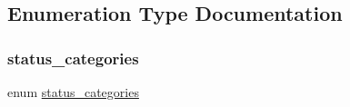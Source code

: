 \subsection{Enumeration Type Documentation}
\mbox{\label{group__group__sam0__utils__status__codes_ga477539e8a67b0cab096e8ecda6f5d7d6}} 
\subsubsection{\texorpdfstring{status\_categories}{status\_categories}}
{\footnotesize\ttfamily enum \mbox{\hyperlink{group__group__sam0__utils__status__codes_ga477539e8a67b0cab096e8ecda6f5d7d6}{status\+\_\+categories}}}

